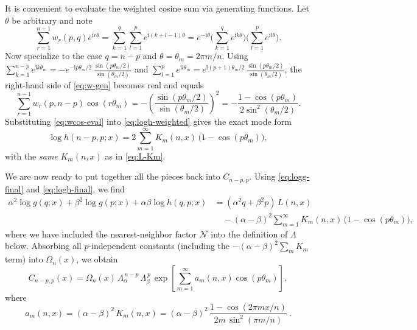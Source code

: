 \documentclass[11pt]{article}
\newcommand{\ii}{\mathrm{i}}
\begin{document}
It is convenient to evaluate the weighted cosine sum via generating functions.
Let $\theta$ be arbitrary and note
\begin{equation}
\sum_{r=1}^{n-1} w_r(p,q)e^{\ii r\theta}
=\sum_{k=1}^{q}\sum_{l=1}^{p} e^{\ii(k+l-1)\theta}
=e^{-\ii\theta}\Big(\sum_{k=1}^{q}e^{\ii k\theta}\Big)\Big(\sum_{l=1}^{p}e^{\ii l\theta}\Big).
\label{eq:w-gen}
\end{equation}
Now specialize to the case $q=n-p$ and $\theta=\theta_m=2\pi m/n$.
Using $\sum_{k=1}^{n-p} e^{\ii k\theta_m}=-e^{-\ii p\theta_m/2}\,\frac{\sin(p\theta_m/2)}{\sin(\theta_m/2)}$
and $\sum_{l=1}^{p} e^{\ii l\theta_m}=e^{\ii(p+1)\theta_m/2}\,\frac{\sin(p\theta_m/2)}{\sin(\theta_m/2)}$,
the right-hand side of \eqref{eq:w-gen} becomes real and equals
\begin{equation}
\sum_{r=1}^{n-1} w_r(p,n-p)\cos(r\theta_m)
= -\left(\frac{\sin(p\theta_m/2)}{\sin(\theta_m/2)}\right)^2
= -\frac{1-\cos(p\theta_m)}{2\sin^2(\theta_m/2)}.
\label{eq:wcos-eval}
\end{equation}
Substituting \eqref{eq:wcos-eval} into \eqref{eq:logh-weighted} gives the exact mode form
\begin{equation}
\log h(n-p,p;x)= 2\sum_{m=1}^\infty K_m(n,x)\,\bigl(1-\cos(p\theta_m)\bigr),
\label{eq:logh-final}
\end{equation}
with the \emph{same} $K_m(n,x)$ as in \eqref{eq:L-Km}.

We are now ready to put together all the pieces back into $C_{n-p,p}$.
Using \eqref{eq:logg-final} and \eqref{eq:logh-final}, we find
\begin{align}
\alpha^2\log g(q;x)+\beta^2\log g(p;x)+\alpha\beta\log h(q,p;x)
&=(\alpha^2 q+\beta^2 p)\,L(n,x)
\nonumber\\
&\quad-(\alpha-\beta)^2\sum_{m=1}^\infty K_m(n,x)\,\bigl(1-\cos(p\theta_m)\bigr),
\label{eq:combo}
\end{align}
where we have included the nearest-neighbor factor $\mathcal{N}$ into the definition of $\Lambda$ below.
Absorbing all $p$-independent constants (including the $-(\alpha-\beta)^2\sum_m K_m$ term) into
$\Omega_n(x)$, we obtain
\begin{equation}
C_{n-p,p}(x)
=\Omega_n(x)\,\Lambda_\alpha^{\,n-p}\,\Lambda_\beta^{\,p}\,
\exp\!\left[\sum_{m=1}^\infty a_m(n,x)\cos(p\theta_m)\right],
\label{eq:C-expcos}
\end{equation}
where
\begin{equation}
a_m(n,x)=(\alpha-\beta)^2\,K_m(n,x)
=(\alpha-\beta)^2\,\frac{1-\cos(2\pi m x/n)}{2m\,\sin^2(\pi m/n)}\ .
\label{eq:am}
\end{equation}
\end{document}
